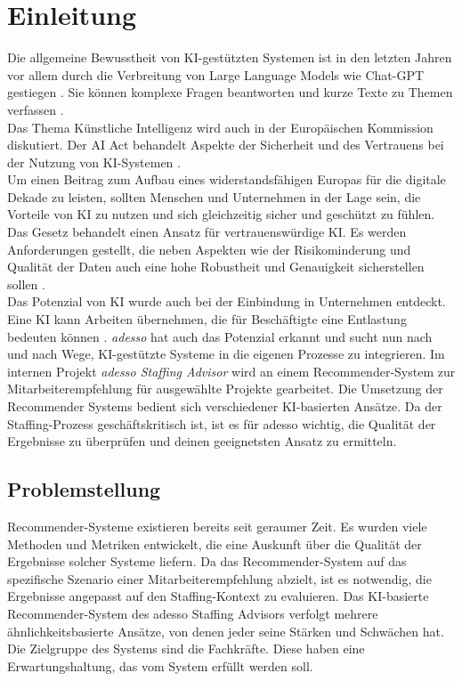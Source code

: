 \chapter{Einleitung}
\label{chap:einleitung}
Die allgemeine Bewusstheit von KI-gestützten Systemen ist in den letzten Jahren vor allem durch die Verbreitung von Large Language Models wie Chat-GPT gestiegen \cite{de2023chatgpt}. Sie können komplexe Fragen beantworten und kurze Texte zu Themen verfassen \cite{de2023chatgpt}. \\

Das Thema Künstliche Intelligenz wird auch in der Europäischen Kommission diskutiert. Der AI Act behandelt Aspekte der Sicherheit und des Vertrauens bei der Nutzung von KI-Systemen \cite{eu}. \\
\glqq Um einen Beitrag zum Aufbau eines widerstandsfähigen Europas für die digitale Dekade zu leisten, sollten Menschen und Unternehmen in der Lage sein, die Vorteile von KI zu nutzen und sich gleichzeitig sicher und geschützt zu fühlen.\grqq \cite{euger} \\
Das Gesetz behandelt einen Ansatz für vertrauenswürdige KI. Es werden Anforderungen gestellt, die neben Aspekten wie der Risikominderung und Qualität der Daten auch eine hohe Robustheit und Genauigkeit sicherstellen sollen \cite{highrisk}. \\

Das Potenzial von KI wurde auch bei der Einbindung in Unternehmen entdeckt. Eine KI kann Arbeiten übernehmen, die für Beschäftigte eine Entlastung bedeuten können \cite{stowasser2020einfuhrung}. \emph{adesso} hat auch das Potenzial erkannt und sucht nun nach und nach Wege, KI-gestützte Systeme in die eigenen Prozesse zu integrieren. Im internen Projekt \emph{adesso Staffing Advisor} wird an einem Recommender-System zur Mitarbeiterempfehlung für ausgewählte Projekte gearbeitet. Die Umsetzung der Recommender Systems bedient sich verschiedener KI-basierten Ansätze. Da der Staffing-Prozess geschäftskritisch ist, ist es für adesso wichtig, die Qualität der Ergebnisse zu überprüfen und deinen geeignetsten Ansatz zu ermitteln.

\newpage
\section{Problemstellung}
\label{sec:problemstellung}
Recommender-Systeme existieren bereits seit geraumer Zeit. Es wurden viele Methoden und Metriken entwickelt, die eine Auskunft über die Qualität der Ergebnisse solcher Systeme liefern. Da das Recommender-System auf das spezifische Szenario einer Mitarbeiterempfehlung abzielt, ist es notwendig, die Ergebnisse angepasst auf den Staffing-Kontext zu evaluieren. Das KI-basierte Recommender-System des adesso Staffing Advisors verfolgt mehrere ähnlichkeitsbasierte Ansätze, von denen jeder seine Stärken und Schwächen hat. Die Zielgruppe des Systems sind die Fachkräfte. Diese haben eine Erwartungshaltung, das vom System erfüllt werden soll. \\

